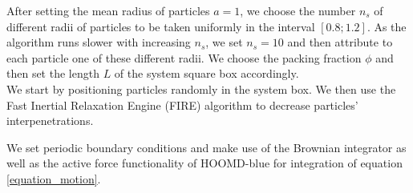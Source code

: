 \documentclass[class=report, float=false, crop=false]{standalone}
\begin{document}

After setting the mean radius of particles $a = 1$, we choose the number $n_s$ of different radii of particles to be taken uniformly in the interval $[0.8; 1.2]$. As the algorithm runs slower with increasing $n_s$, we set $n_s = 10$ and then attribute to each particle one of these different radii. We choose the packing fraction $\phi$ and then set the length $L$ of the system square box accordingly.\\

We start by positioning particles randomly in the system box. We then use the Fast Inertial Relaxation Engine (FIRE) algorithm \cite{bitzek2006structural} to decrease particles' interpenetrations.


We set periodic boundary conditions and make use of the Brownian integrator as well as the active force functionality of HOOMD-blue for integration of equation \ref{equation_motion}.
\end{document}
